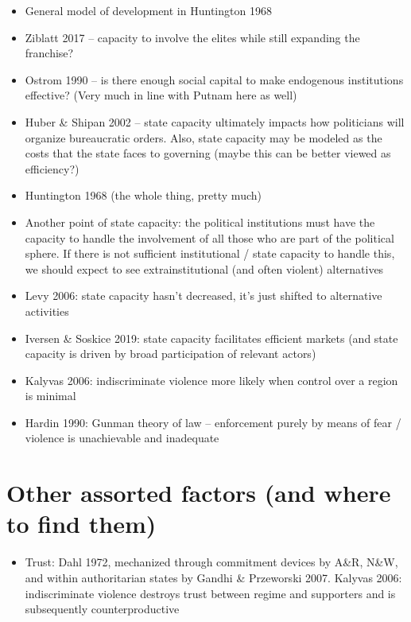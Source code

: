 \documentclass[12pt]{article}
\begin{document}
\begin{itemize}
    \item General model of development in Huntington 1968
    \item Ziblatt 2017 -- capacity to involve the elites while still expanding the franchise?
    \item Ostrom 1990 -- is there enough social capital to make endogenous institutions effective? (Very much in line with Putnam here as well)
    \item Huber \& Shipan 2002 -- state capacity ultimately impacts how politicians will organize bureaucratic orders. Also, state capacity may be modeled as the costs that the state faces to governing (maybe this can be better viewed as efficiency?)
    \item Huntington 1968 (the whole thing, pretty much)
    \item Another point of state capacity: the political institutions must have the capacity to handle the involvement of all those who are part of the political sphere. If there is not sufficient institutional / state capacity to handle this, we should expect to see extrainstitutional (and often violent) alternatives
    \item Levy 2006: state capacity hasn't decreased, it's just shifted to alternative activities
    \item Iversen \& Soskice 2019: state capacity facilitates efficient markets (and state capacity is driven by broad participation of relevant actors)
    \item Kalyvas 2006: indiscriminate violence more likely when control over a region is minimal
    \item Hardin 1990: Gunman theory of law -- enforcement purely by means of fear / violence is unachievable and inadequate
\end{itemize}



\section*{Other assorted factors (and where to find them)}

\begin{itemize}
    \item Trust: Dahl 1972, mechanized through commitment devices by A\&R, N\&W, and within authoritarian states by Gandhi \& Przeworski 2007. Kalyvas 2006: indiscriminate violence destroys trust between regime and supporters and is subsequently counterproductive
\end{itemize}
\end{document}
